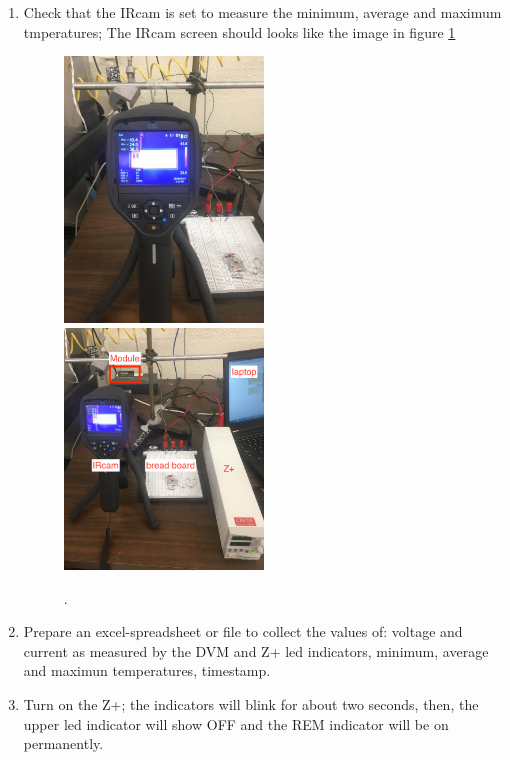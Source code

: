 \documentclass[12pt]{unlsilabsop}
\begin{document}
\begin{enumerate}
    \item Check that the IRcam is set to measure the minimum, average and maximum tmperatures; The IRcam screen should looks like the image in figure \ref{ircam_setup}   
    \begin{center}
        \begin{figure}[h]
          \includegraphics[width=0.5\textwidth]{img/ircam_setup}
          \includegraphics[width=0.5\textwidth]{img/setup.png}
          \caption{.}
          \label{ircam_setup}
        \end{figure}
      \end{center}
    \item Prepare an excel-spreadsheet or file to collect the values of: voltage and current as measured by the DVM and Z+ led indicators, minimum, average and maximun temperatures, timestamp. 
    \item Turn on the Z+; the indicators will blink for about two seconds, then, the upper led indicator will show OFF and the REM indicator will be on permanently. 

\end{enumerate}
\end{document}
